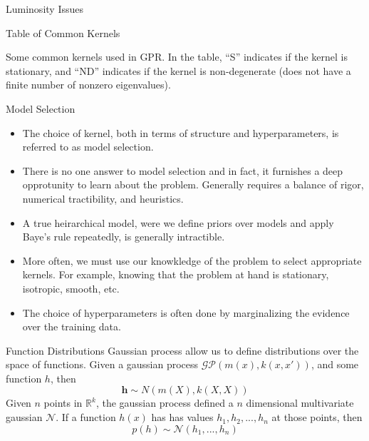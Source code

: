 \documentclass[10pt]{beamer}
\begin{document}
\begin{frame}{Luminosity Issues}
  \relax
\end{frame}

\begin{frame}{Table of Common Kernels}
  \begin{center}
  \end{center}
  \begin{center}
    Some common kernels used in GPR. In the table, ``S'' indicates if the kernel is stationary, and ``ND'' indicates if the kernel is non-degenerate (does not have a finite number of nonzero eigenvalues).
  \end{center}
\end{frame}

\begin{frame}{Model Selection}
  \begin{itemize}
  \item The choice of kernel, both in terms of structure and hyperparameters, is referred to as model selection. 
  \item There is no one answer to model selection and in fact, it furnishes a deep opprotunity to learn about the problem.
    Generally requires a balance of rigor, numerical tractibility, and heuristics.  
  \item A true heirarchical model, were we define priors over models and apply Baye's rule repeatedly, is generally intractible.
  \item More often, we must use our knowkledge of the problem to select appropriate kernels. For example, knowing that the problem at hand is stationary, isotropic, smooth, etc. 
  \item The choice of hyperparameters is often done by marginalizing the evidence over the training data.
  \end{itemize}
\end{frame}

\begin{frame}{Function Distributions}
  Gaussian process allow us to define distributions over the space of functions. Given a gaussian process $\mathcal{GP} \left( m(x) , k(x,x') \right)$, and some function $h$, then
  \begin{equation}
    \mathbf{h} \sim N(m(X) , k(X,X))
  \end{equation}
  Given $n$ points in $\mathbb{R}^{k}$, the gaussian process defined a $n$ dimensional multivariate gaussian $\mathcal{N}$. If a function $h(x)$ has has values $h_1,h_2,...,h_{n}$ at those points, then
  \begin{equation}
    p \left( h \right) \sim \mathcal{N}(h_{1}, ..., h_{n})
  \end{equation}

  \begin{center}
  \end{center}
\end{frame}
\end{document}
